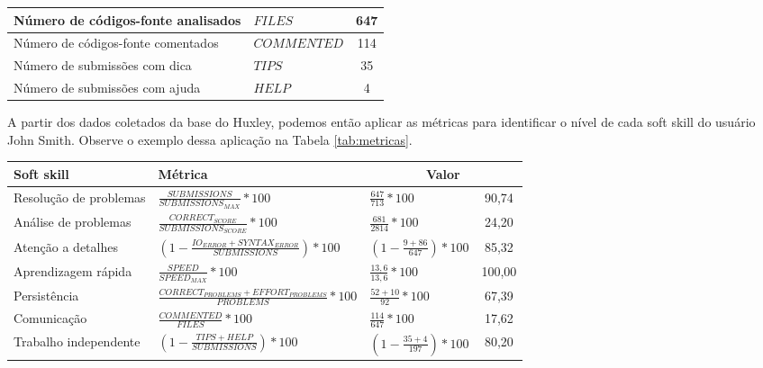 \begin{table*}[h]
\begin{tabular}{|p{9cm}|l|c|}
				Número de códigos-fonte analisados										& $ FILES$ 										& 647		\\\hline
				Número de códigos-fonte comentados										& $ COMMENTED$ 								& 114		\\\hline
				
				Número de submissões com dica													& $ TIPS$ 										& 35		\\\hline
				Número de submissões com ajuda												& $ HELP$ 										& 4			\\\hline
				
					
     \end{tabular}
		\label{tab:dadosmetricas}
\end{table*}

A partir dos dados coletados da base do Huxley, podemos então aplicar as métricas para identificar o nível de cada soft skill do usuário John Smith. Observe o exemplo dessa aplicação na Tabela \ref{tab:metricas}.

\begin{table*}[h]
\footnotesize
\caption{\small Métricas para identificar o nível das softs skills}
\addtolength{\tabcolsep}{-3.5pt}
\renewcommand{\arraystretch}{1.7} 
\centering

		\begin{tabular}{|p{4cm}|p{7cm}|p{3cm}|c|}\hline
		
        \textbf{Soft skill} & \textbf{Métrica} & \multicolumn{2}{c|}{\textbf{Valor}} \\\hline
													
				Resolução de problemas & $\frac{SUBMISSIONS}{SUBMISSIONS_{MAX}} * 100$
															 & $\frac{647}{713} * 100$ & 90,74 \\\hline
				
				Análise de problemas & $\frac{CORRECT_{SCORE}}{SUBMISSIONS_{SCORE}} * 100$
														 & $\frac{681}{2814} * 100$ & 24,20 \\\hline
				
				Atenção a detalhes & $\left(1 - \frac {IO_{ERROR} + SYNTAX_{ERROR}}{SUBMISSIONS}\right) * 100$
													 & $\left(1 - \frac {9 + 86}{647}\right) * 100$ & 85,32 \\\hline
				
				Aprendizagem rápida & $\frac{SPEED}{SPEED_{MAX}} * 100$
														& $\frac{13,6}{13,6} * 100$ & 100,00 \\\hline
				
				Persistência & $\frac{CORRECT_{PROBLEMS} + EFFORT_{PROBLEMS}}{PROBLEMS} * 100$
										 & $\frac{52 + 10}{92} * 100$ & 67,39 \\\hline
				
				Comunicação & $\frac{COMMENTED}{FILES} * 100$
										& $\frac{114}{647} * 100$ & 17,62	\\\hline
				
				Trabalho independente & $\left(1 - \frac {TIPS + HELP}{SUBMISSIONS}\right) * 100$
															& $\left(1 - \frac {35 + 4}{197}\right) * 100$ & 80,20 \\\hline
													
     \end{tabular}
		\label{tab:metricas}
\end{table*}